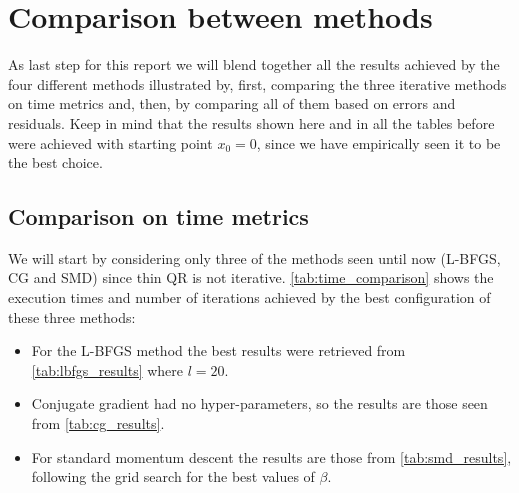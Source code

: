 \section{Comparison between methods}
As last step for this report we will blend together all the results achieved by the four different methods illustrated by, first, comparing the three iterative methods on time metrics and, then, by comparing all of them based on errors and residuals. Keep in mind that the results shown here and in all the tables before were achieved with starting point $x_0=0$, since we have empirically seen it to be the best choice.

\subsection{Comparison on time metrics}
We will start by considering only three of the methods seen until now (L-BFGS, CG and SMD) since thin QR is not iterative. \autoref{tab:time_comparison} shows the execution times and number of iterations achieved by the best configuration of these three methods:
\begin{itemize}
    \item For the L-BFGS method the best results were retrieved from \autoref{tab:lbfgs_results} where $l=20$.
    \item Conjugate gradient had no hyper-parameters, so the results are those seen from \autoref{tab:cg_results}.
    \item For standard momentum descent the results are those from \autoref{tab:smd_results}, following the grid search for the best values of $\beta$.
\end{itemize}

